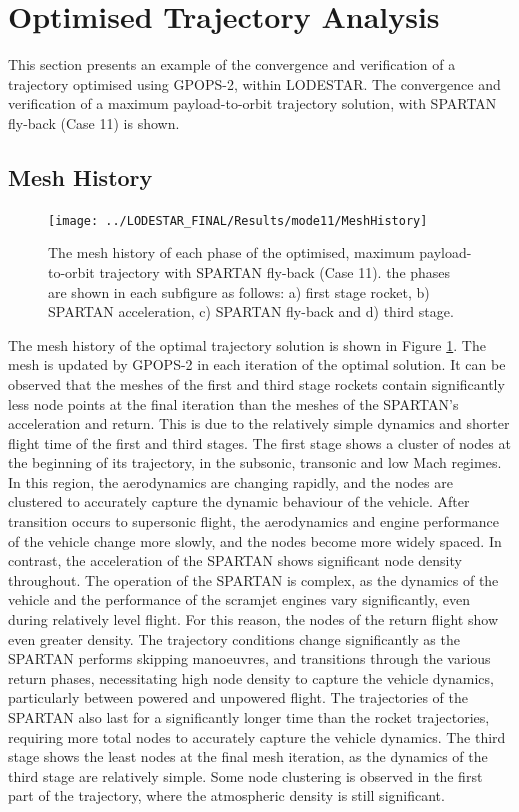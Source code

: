 \section{Optimised Trajectory Analysis}

This section presents an example of the convergence and verification of a trajectory optimised using GPOPS-2, within LODESTAR. The convergence and verification of a maximum payload-to-orbit trajectory solution, with SPARTAN fly-back (Case 11) is shown. 

\subsection{Mesh History}

\begin{figure}[ht]
	\centering
	\texttt{[image: ../LODESTAR\_FINAL/Results/mode11/MeshHistory]}
	\caption{The mesh history of each phase of the optimised, maximum payload-to-orbit trajectory with SPARTAN fly-back (Case 11). the phases are shown in each subfigure as follows: a) first stage rocket, b) SPARTAN acceleration, c) SPARTAN fly-back and d) third stage.}
	\label{fig:MeshHistory}
\end{figure}
The mesh history of the optimal trajectory solution is shown in Figure \ref{fig:MeshHistory}. The mesh is updated by GPOPS-2 in each iteration of the optimal solution. It can be observed that the meshes of the first and third stage rockets contain significantly less node points at the final iteration than the meshes of the SPARTAN's acceleration and return. This is due to the relatively simple dynamics and shorter flight time of the first and third stages. The first stage shows a cluster of nodes at the beginning of its trajectory, in the subsonic, transonic and low Mach regimes. In this region, the aerodynamics are changing rapidly, and the nodes are clustered to accurately capture the dynamic behaviour of the vehicle. After transition occurs to supersonic flight, the aerodynamics and engine performance of the vehicle change more slowly, and the nodes become more widely spaced. In contrast, the acceleration of the SPARTAN shows significant node density throughout. The operation of the SPARTAN is complex, as the dynamics of the vehicle and the performance of the scramjet engines vary significantly, even during relatively level flight. For this reason, the nodes of the return flight show even greater density. The trajectory conditions change significantly as the SPARTAN performs skipping manoeuvres, and transitions through the various return phases, necessitating high node density to capture the vehicle dynamics, particularly between powered and unpowered flight. The trajectories of the SPARTAN also last for a significantly longer time than the rocket trajectories, requiring more total nodes to accurately capture the vehicle dynamics. The third stage shows the least nodes at the final mesh iteration, as the dynamics of the third stage are relatively simple. Some node  clustering is observed in the first part of the trajectory, where the atmospheric density is still significant. 



